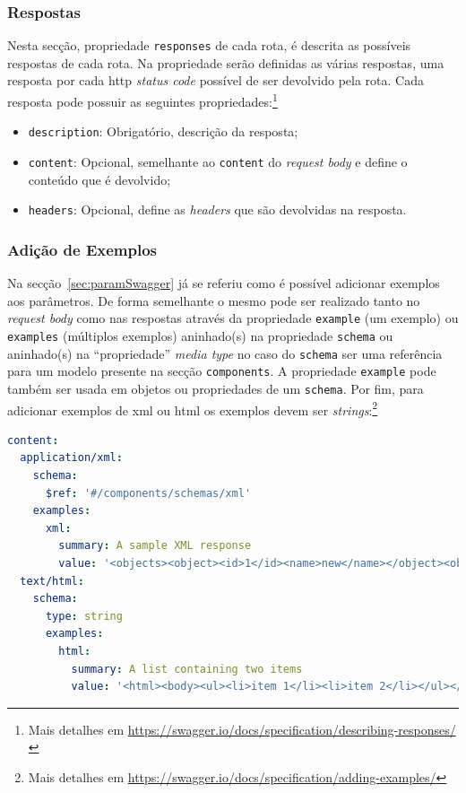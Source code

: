 \subsubsection{Respostas}
Nesta secção, propriedade \texttt{responses} de cada rota, é descrita as possíveis respostas de cada rota. 
Na propriedade serão definidas as várias respostas, uma resposta por cada \acrshort{http} \textit{status code} 
possível de ser devolvido pela rota. Cada resposta pode possuir as seguintes propriedades:\footnote{Mais detalhes em \url{https://swagger.io/docs/specification/describing-responses/}}
\begin{itemize}
    \item \texttt{description}: Obrigatório, descrição da resposta;
    \item \texttt{content}: Opcional, semelhante ao \texttt{content} do \textit{request body} e define o 
    conteúdo que é devolvido;
    \item \texttt{headers}: Opcional, define as \textit{headers} que são devolvidas na resposta.
\end{itemize}

\subsubsection{Adição de Exemplos}
Na secção~\ref{sec:paramSwagger} já se referiu como é possível adicionar exemplos aos parâmetros. 
De forma semelhante o mesmo pode ser realizado tanto no \textit{request body} como nas respostas através da 
propriedade \texttt{example} (um exemplo) ou \texttt{examples} (múltiplos exemplos) aninhado(s) na propriedade 
\texttt{schema} ou aninhado(s) na ``propriedade'' \textit{media type} no caso do \texttt{schema} ser uma 
referência para um modelo presente na secção \texttt{components}. A propriedade \texttt{example} pode também ser 
usada em objetos ou propriedades de um \texttt{schema}. Por fim, para adicionar exemplos de \acrshort{xml} ou 
\acrshort{html} os exemplos devem ser \textit{strings}:\footnote{Mais detalhes em \url{https://swagger.io/docs/specification/adding-examples/}}
\begin{lstlisting}[language=yaml, caption=Exemplo de adição de exemplos para \acrshort{xml} e \acrshort{html} na especificação \textit{OpenAPI}]
content:
  application/xml:
    schema:
      $ref: '#/components/schemas/xml'
    examples:
      xml:
        summary: A sample XML response
        value: '<objects><object><id>1</id><name>new</name></object><object><id>2</id></object></objects>'
  text/html:
    schema:
      type: string
      examples:
        html:
          summary: A list containing two items
          value: '<html><body><ul><li>item 1</li><li>item 2</li></ul></body></html>'
\end{lstlisting}

